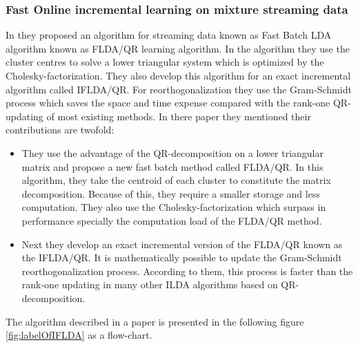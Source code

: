 \subsubsection{Fast Online incremental learning on mixture streaming data}
In \cite{p401} they proposed an algorithm for streaming data known as Fast Batch LDA algorithm known as FLDA/QR learning algorithm. In the algorithm they use the cluster centres to solve a lower triangular system which is optimized by the Cholesky-factorization. They also develop this algorithm for an exact incremental algorithm called IFLDA/QR. For reorthogonalization they use the Gram-Schmidt process which saves the space and time expense compared with the rank-one QR-updating of most existing methods. In there paper they mentioned their contributions are twofold:
\begin{itemize}
	\item They use the advantage of the QR-decomposition on a lower triangular matrix and propose a new fast batch method called FLDA/QR. In this algorithm, they take the centroid of each cluster to constitute the matrix decomposition. Because of this, they require a smaller storage and less computation. They also use the Cholesky-factorization which surpass in performance specially the computation load of the FLDA/QR method. 
	\item Next they develop an exact incremental version of the FLDA/QR known as the IFLDA/QR. It is mathematically possible to update the Gram-Schmidt reorthogonalization process. According to them, this process is faster than the rank-one updating in many other ILDA algorithms based on QR-decomposition.
\end{itemize}
The algorithm described in a paper is presented in the following figure \ref{fig:labelOfIFLDA} as a flow-chart.

